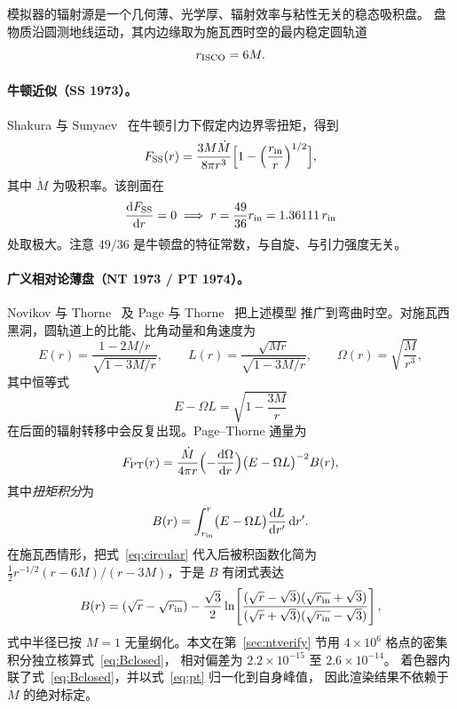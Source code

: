 模拟器的辐射源是一个几何薄、光学厚、辐射效率与粘性无关的稳态吸积盘。
盘物质沿圆测地线运动，其内边缘取为施瓦西时空的最内稳定圆轨道
\begin{equation}
r_{\mathrm{ISCO}}=6M .
\label{eq:isco}
\end{equation}

\paragraph{牛顿近似（SS 1973）。}
Shakura 与 Sunyaev~\cite{ss1973} 在牛顿引力下假定内边界零扭矩，得到
\begin{equation}
F_{\rm SS}(r)=\frac{3M\dot M}{8\pi r^{3}}
\Bigl[1-\Bigl(\frac{r_{\mathrm{in}}}{r}\Bigr)^{1/2}\Bigr],
\label{eq:ss}
\end{equation}
其中 $\dot M$ 为吸积率。该剖面在
\begin{equation}
\frac{\mathrm{d} F_{\rm SS}}{\mathrm{d} r}=0
\;\Longrightarrow\;
r=\frac{49}{36}r_{\mathrm{in}}=1.36111\,r_{\mathrm{in}}
\end{equation}
处取极大。注意 $49/36$ 是牛顿盘的特征常数，与自旋、与引力强度无关。

\paragraph{广义相对论薄盘（NT 1973 / PT 1974）。}
Novikov 与 Thorne~\cite{nt1973} 及 Page 与 Thorne~\cite{pt1974} 把上述模型
推广到弯曲时空。对施瓦西黑洞，圆轨道上的比能、比角动量和角速度为
\begin{equation}
E(r)=\frac{1-2M/r}{\sqrt{1-3M/r}},\qquad
L(r)=\frac{\sqrt{Mr}}{\sqrt{1-3M/r}},\qquad
\Omega(r)=\sqrt{\frac{M}{r^{3}}} ,
\label{eq:circular}
\end{equation}
其中恒等式
\begin{equation}
E-\Omega L=\sqrt{1-\frac{3M}{r}}
\label{eq:redshift}
\end{equation}
在后面的辐射转移中会反复出现。Page--Thorne 通量为
\begin{equation}
F_{\rm PT}(r)=\frac{\dot M}{4\pi r}
\Bigl(-\frac{\mathrm{d}\Omega}{\mathrm{d} r}\Bigr)
\bigl(E-\Omega L\bigr)^{-2}B(r),
\label{eq:pt}
\end{equation}
其中\emph{扭矩积分}为
\begin{equation}
B(r)=\int_{r_{\mathrm{in}}}^{r}\bigl(E-\Omega L\bigr)\frac{\mathrm{d} L}{\mathrm{d} r'}\,\mathrm{d} r' .
\label{eq:torque}
\end{equation}
在施瓦西情形，把式~\eqref{eq:circular} 代入后被积函数化简为
$\frac12 r^{-1/2}(r-6M)/(r-3M)$，于是 $B$ 有闭式表达
\begin{equation}
B(r)=(\sqrt r-\sqrt{r_{\mathrm{in}}})
-\frac{\sqrt3}{2}\ln\!\left[
\frac{(\sqrt r-\sqrt3)(\sqrt{r_{\mathrm{in}}}+\sqrt3)}
{(\sqrt r+\sqrt3)(\sqrt{r_{\mathrm{in}}}-\sqrt3)}
\right],
\label{eq:Bclosed}
\end{equation}
式中半径已按 $M=1$ 无量纲化。本文在第~\ref{sec:ntverify} 节用
$4\times10^{6}$ 格点的密集积分独立核算式~\eqref{eq:Bclosed}，
相对偏差为 $2.2\times10^{-15}$ 至 $2.6\times10^{-14}$。
着色器内联了式~\eqref{eq:Bclosed}，并以式~\eqref{eq:pt} 归一化到自身峰值，
因此渲染结果不依赖于 $\dot M$ 的绝对标定。

